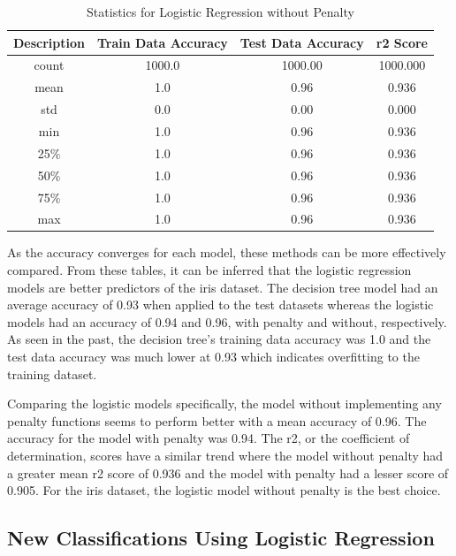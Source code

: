\documentclass[journal]{IEEEtran}
\begin{document}
\begin{table}[h!]
\centering
\begin{tabular}{ c | c c c }
    Description & Train Data Accuracy & Test Data Accuracy & r2 Score \\
\hline
count      &         1000.0     &        1000.00 & 1000.000\\
mean       &            1.0      &          0.96 &    0.936\\
std        &            0.0      &          0.00 &    0.000\\
min        &            1.0      &          0.96 &    0.936\\
25\%       &             1.0     &           0.96 &    0.936\\
50\%       &             1.0     &           0.96 &    0.936\\
75\%        &            1.0     &           0.96 &    0.936\\
max        &            1.0      &          0.96  &   0.936\\
\end{tabular}
\caption{Statistics for Logistic Regression without Penalty}
\label{table:logRegL2}
\end{table}

As the accuracy converges for each model, these methods can be more effectively compared. From these tables, it can be inferred that the logistic regression models are better predictors of the iris dataset. The decision tree model had an average accuracy of 0.93 when applied to the test datasets whereas the logistic models had an accuracy of 0.94 and 0.96, with penalty and without, respectively. As seen in the past, the decision tree's training data accuracy was 1.0 and the test data accuracy was much lower at 0.93 which indicates overfitting to the training dataset. 

Comparing the logistic models specifically, the model without implementing any penalty functions seems to perform better with a mean accuracy of 0.96. The accuracy for the model with penalty was 0.94. The r2, or the coefficient of determination, scores have a similar trend where the model without penalty had a greater mean r2 score of 0.936 and the model with penalty had a lesser score of 0.905. For the iris dataset, the logistic model without penalty is the best choice.

\subsection{New Classifications Using Logistic Regression}
\end{document}
